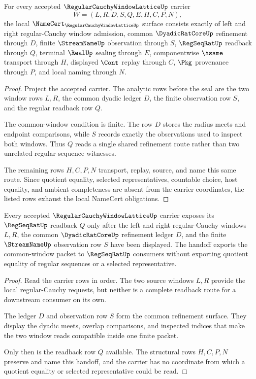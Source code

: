 \begin{theorem}
\label{thm:regular-cauchy-window-lattice-namecert-obligations}
For every accepted $\RegularCauchyWindowLatticeUp$ carrier
$$
W=(L,R,D,S,Q,E,H,C,P,N),
$$
the local $\NameCert_{\RegularCauchyWindowLatticeUp}$ surface consists exactly of left and right regular-Cauchy window admission, common $\DyadicRatCoreUp$ refinement through $D$, finite $\StreamNameUp$ observation through $S$, $\RegSeqRatUp$ readback through $Q$, terminal $\RealUp$ sealing through $E$, componentwise $\hsame$ transport through $H$, displayed $\Cont$ replay through $C$, $\Pkg$ provenance through $P$, and local naming through $N$.
\end{theorem}
\begin{proof}
Project the accepted carrier. The analytic rows before the seal are the two window rows $L,R$, the common dyadic ledger $D$, the finite observation row $S$, and the regular readback row $Q$.

The common-window condition is finite. The row $D$ stores the radius meets and endpoint comparisons, while $S$ records exactly the observations used to inspect both windows. Thus $Q$ reads a single shared refinement route rather than two unrelated regular-sequence witnesses.

The remaining rows $H,C,P,N$ transport, replay, source, and name this same route. Since quotient equality, selected representatives, countable choice, host equality, and ambient completeness are absent from the carrier coordinates, the listed rows exhaust the local NameCert obligations.
\end{proof}

\begin{theorem}
\label{thm:regular-cauchy-window-lattice-regseqrat-handoff}
Every accepted $\RegularCauchyWindowLatticeUp$ carrier exposes its $\RegSeqRatUp$ readback $Q$ only after the left and right regular-Cauchy windows $L,R$, the common $\DyadicRatCoreUp$ refinement ledger $D$, and the finite $\StreamNameUp$ observation row $S$ have been displayed. The handoff exports the common-window packet to $\RegSeqRatUp$ consumers without exporting quotient equality of regular sequences or a selected representative.
\end{theorem}
\begin{proof}
Read the carrier rows in order. The two source windows $L,R$ provide the local regular-Cauchy requests, but neither is a complete readback route for a downstream consumer on its own.

The ledger $D$ and observation row $S$ form the common refinement surface. They display the dyadic meets, overlap comparisons, and inspected indices that make the two window reads compatible inside one finite packet.

Only then is the readback row $Q$ available. The structural rows $H,C,P,N$ preserve and name this handoff, and the carrier has no coordinate from which a quotient equality or selected representative could be read.
\end{proof}

